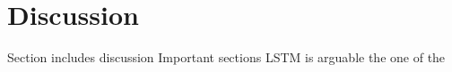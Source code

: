 \section{Discussion}
Section includes discussion
Important sections
LSTM is arguable the one of the 
